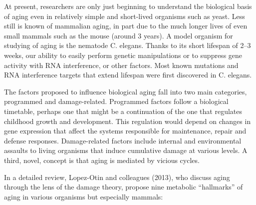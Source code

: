 At present, researchers are only just beginning to understand the biological basis of aging even in relatively simple and short-lived organisms such as yeast. Less still is known of mammalian aging, in part due to the much longer lives of even small mammals such as the mouse (around 3 years). A model organism for studying of aging is the nematode C. elegans. Thanks to its short lifespan of 2--3 weeks, our ability to easily perform genetic manipulations or to suppress gene activity with RNA interference, or other factors. Most known mutations and RNA interference targets that extend lifespan were first discovered in C. elegans.

The factors proposed to influence biological aging fall into two main categories, programmed and damage-related. Programmed factors follow a biological timetable, perhaps one that might be a continuation of the one that regulates childhood growth and development. This regulation would depend on changes in gene expression that affect the systems responsible for maintenance, repair and defense responses. Damage-related factors include internal and environmental assaults to living organisms that induce cumulative damage at various levels. A third, novel, concept is that aging is mediated by vicious cycles.

In a detailed review, Lopez-Otin and colleagues (2013), who discuss aging through the lens of the damage theory, propose nine metabolic ``hallmarks'' of aging in various organisms but especially mammals:


